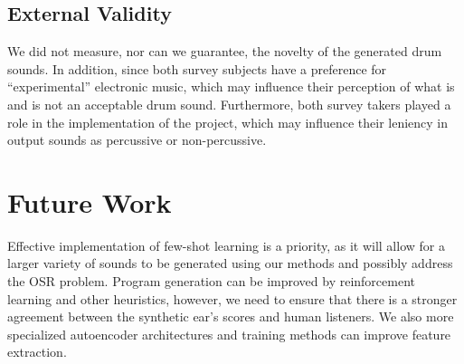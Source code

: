 \documentclass[\main/thesis.tex]{subfiles}
\begin{document}
\subsection{External Validity}
 We did not measure, nor can we guarantee, the novelty of the generated drum sounds. In addition, since both survey subjects have a preference for \enquote{experimental} electronic music, which may influence their perception of what is and is not an acceptable drum sound. Furthermore, both survey takers played a role in the implementation of the project, which may influence their leniency in output sounds as percussive or non-percussive. 
 
 
\section{Future Work} Effective implementation of few-shot learning is a priority, as it will allow for a larger variety of sounds to be generated using our methods and possibly address the OSR problem. Program generation can be improved by reinforcement learning and other heuristics, however, we need to ensure that there is a stronger agreement between the synthetic ear's scores and human listeners. We also more specialized autoencoder architectures and training methods can improve feature extraction.
\end{document}
